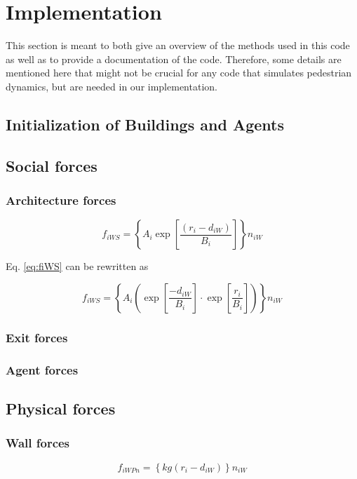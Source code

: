 \documentclass[11pt]{article}
\begin{document}
\section{Implementation}
This section is meant to both give an overview of the methods used in this code as well as to provide a documentation of the code. Therefore, some details are mentioned here that might not be crucial for any code that simulates pedestrian dynamics, but are needed in our implementation. 
\subsection{Initialization of Buildings and Agents}
\subsection{Social forces}
\subsubsection{Architecture forces}
\begin{equation}
	{f_{iWS}} = \left\{ {{A_i}\exp \left[ {\frac{{\left( {{r_i} - {d_{iW}}} \right)}}{{{B_i}}}} \right]} \right\}{n_{iW}}
	\label{eq:fiWS}
\end{equation}

Eq. \eqref{eq:fiWS} can be rewritten as

\begin{equation}
	{f_{iWS}} = \left\{ {{A_i}\left( {\exp \left[ {\frac{{ - {d_{iW}}}}{{{B_i}}}} \right] \cdot \exp \left[ {\frac{{{r_i}}}{{{B_i}}}} \right]} \right)} \right\}{n_{iW}}
	\label{eq:fiWS2}
\end{equation}

\subsubsection{Exit forces}
\subsubsection{Agent forces}
\subsection{Physical forces}

\subsubsection{Wall forces}
\begin{equation}
	{f_{iWPn}} = \left\{ {kg\left( {{r_i} - {d_{iW}}} \right)} \right\}{n_{iW}}
	\label{eq:fiWPn}
\end{equation}
\end{document}
